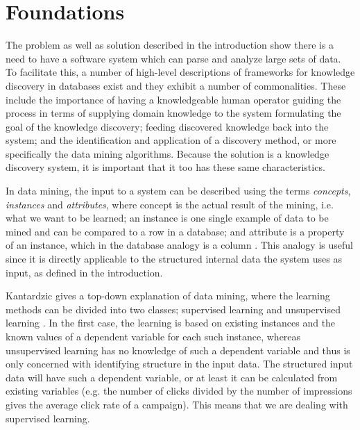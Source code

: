 \documentclass{sig-alternate}
\begin{document}
\section{Foundations}
\label{ch:Foundations}
The problem as well as solution described in the introduction show there is a need to have a software system which can parse and analyze large sets of data. To facilitate this, a number of high-level descriptions of frameworks for knowledge discovery in databases exist \citep{Fayyad1996, Frawley1992} and they exhibit a number of commonalities. These include the importance of having a knowledgeable human operator guiding the process in terms of supplying domain knowledge to the system formulating the goal of the knowledge discovery; feeding discovered knowledge back into the system; and the identification and application of a discovery method, or more specifically the data mining algorithms. Because the solution is a knowledge discovery system, it is important that it too has these same characteristics.

In data mining, the input to a system can be described using the terms \emph{concepts}, \emph{instances} and \emph{attributes}, where concept is the actual result of the mining, i.e. what we want to be learned; an instance is one single example of data to be mined and can be compared to a row in a database; and attribute is a property of an instance, which in the database analogy is a column \citep{Witten2011}. This analogy is useful since it is directly applicable to the structured internal data the system uses as input, as defined in the introduction.

Kantardzic gives a top-down explanation of data mining, where the learning methods can be divided into two classes; supervised learning and unsupervised learning \cite{Kantardzic2011}. In the first case, the learning is based on existing instances and the known values of a dependent variable for each such instance, whereas unsupervised learning has no knowledge of such a dependent variable and thus is only concerned with identifying structure in the input data. The structured input data will have such a dependent variable, or at least it can be calculated from existing variables (e.g. the number of clicks divided by the number of impressions gives the average click rate of a campaign). This means that we are dealing with supervised learning.
\end{document}
